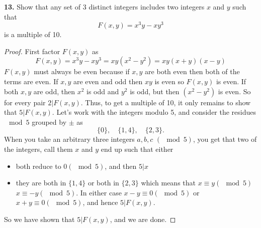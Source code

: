 \documentclass[12pt]{amsart}
\begin{document}
\begin{onehalfspace}
        \noindent\textbf{13.} Show that any set of 3 distinct integers includes two integers $x$ and $y$
        such that
        \begin{displaymath}
            F(x,y) = x^3y - xy^3
        \end{displaymath}
        is a multiple of 10.
        \begin{proof}
            First factor $F(x,y)$ as
            \begin{displaymath}
                F(x,y) = x^3y-xy^3 = xy(x^2-y^2) = xy(x+y)(x-y)
            \end{displaymath}
            $F(x,y)$ must always be even because if $x,y$ are both even then both of the terms are even.
            If $x,y$ are even and odd then $xy$ is even so $F(x,y)$ is even.
            If both $x,y$ are odd, then $x^2$ is odd and $y^2$ is odd, but then $(x^2-y^2)$ is even.
            So for every pair $2|F(x,y)$.
            Thus, to get a multiple of 10, it only remains to show that $5|F(x,y)$.
            Let's work with the integers modulo 5, and consider the residues $\mod{5}$ grouped by $\pm$ as
            \begin{displaymath}
                \{0\},\quad\{1,4\},\quad\{2,3\}.
            \end{displaymath}
            When you take an arbitrary three integers $a,b,c$ $(\mod{5})$, you get that two of the integers, call
            them $x$ and $y$ end up such that either
            \begin{itemize}
                \item[-] both reduce to $0(\mod{5})$, and then $5|x$
                \item[-] they are both in $\{1,4\}$ or both in $\{2,3\}$ which means that $x\equiv y(\mod{5})$
                         $x\equiv -y(\mod{5})$. In either case $x-y\equiv 0 (\mod{5})$ or $x+y\equiv 0 (\mod{5})$, and
                         hence $5|F(x,y)$.
            \end{itemize}
            So we have shown that $5|F(x,y)$, and we are done.
        \end{proof}


\end{onehalfspace}
\end{document}
